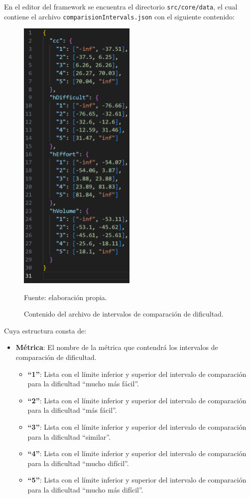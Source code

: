 \documentclass[letterpaper,12pt]{article}
\begin{document}
En el editor del framework se encuentra el directorio \texttt{src/core/data}, el cual contiene el archivo \texttt{comparisionIntervals.json} con el siguiente contenido:
\begin{figure}[H]
  \centering
  \includegraphics[width=0.5\textwidth]{figures/metrics4.png}
  \caption{Contenido del archivo de intervalos de comparación de dificultad.} Fuente: elaboración propia.
  \label{img:metrics4}
\end{figure}
Cuya estructura consta de:
\begin{itemize}
  \item \textbf{Métrica}: El nombre de la métrica que contendrá los intervalos de comparación de dificultad.
        \begin{itemize}
          \item \textbf{``1''}: Lista con el límite inferior y superior del intervalo de comparación para la dificultad ``mucho más fácil''.
          \item \textbf{``2''}: Lista con el límite inferior y superior del intervalo de comparación para la dificultad ``más fácil''.
          \item \textbf{``3''}: Lista con el límite inferior y superior del intervalo de comparación para la dificultad ``similar''.
          \item \textbf{``4''}: Lista con el límite inferior y superior del intervalo de comparación para la dificultad ``mucho difícil''.
          \item \textbf{``5''}: Lista con el límite inferior y superior del intervalo de comparación para la dificultad ``mucho más difícil''.
        \end{itemize}
\end{itemize}
\end{document}

